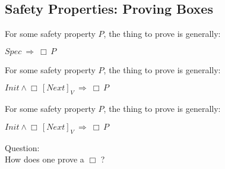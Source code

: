 \subsection{Safety Properties: Proving Boxes}

{
For some safety property $P$,  the thing to prove is generally:
\vspace{25pt}
\begin{theorem}[Safety]
\begin{center}
$Spec\ \Rightarrow\  \Box\, P$
\end{center}
\end{theorem}

\vspace{75pt}
}

{
For some safety property $P$,  the thing to prove is generally:
\vspace{25pt}
\begin{theorem}[Safety]
\begin{center}
$Init \wedge \Box\, [Next]_V \  \Rightarrow \ \Box\, P$
\end{center}
\end{theorem}

\vspace{75pt}
}


{
For some safety property $P$,  the thing to prove is generally:
\vspace{25pt}
\begin{theorem}[Safety]
\begin{center}
$Init \wedge \Box\, [Next]_V \  \Rightarrow \ \Box\, P$
\end{center}
\end{theorem}
\vspace{20pt}
{\color{Maroon} Question:} \\
\hfill How does one prove a $\Box$ ?
\vspace{27pt}
}




